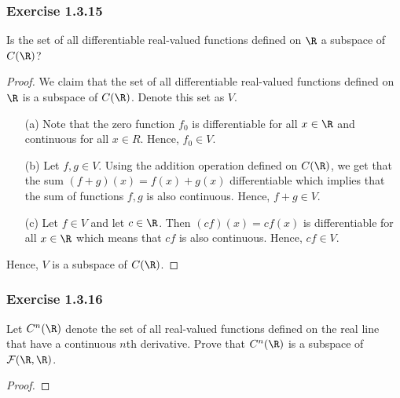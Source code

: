 \subsubsection{Exercise 1.3.15} Is the set of all differentiable real-valued functions defined on \( \R  \) a subspace of \( C(\R ) \)?
\begin{proof}
    We claim that the set of all differentiable real-valued functions defined on \( \R  \) is a subspace of \( C (\R ) \). Denote this set as \( V  \). 
    \begin{enumerate}
        \item[(a)] Note that the zero function \( f_{0} \) is differentiable for all \( x \in \R  \) and continuous for all \( x \in R  \). Hence, \( f_{0} \in V \).
        \item[(b)] Let \( f,g \in V  \). Using the addition operation defined on \( C (\R ) \), we get that the sum \( (f+g)(x) = f(x) + g(x)  \) differentiable which implies that the sum of functions \( f, g \) is also continuous. Hence, \( f+g \in V  \).
        \item[(c)] Let \( f \in V  \) and let \( c \in \R  \). Then \( (cf)(x) = cf(x)  \) is differentiable for all \( x \in \R  \) which means that \( cf  \) is also continuous. Hence, \( cf \in V  \).
    \end{enumerate}
    Hence, \( V  \) is a subspace of \( C(\R ) \).
\end{proof}

\subsubsection{Exercise 1.3.16} Let \( C^{n}(\R ) \) denote the set of all real-valued functions defined on the real line that have a continuous \( n \)th derivative. Prove that \( C^{n}(\R) \) is a subspace of \( \mathcal{F}(\R , \R ) \).

\begin{proof}

\end{proof}

